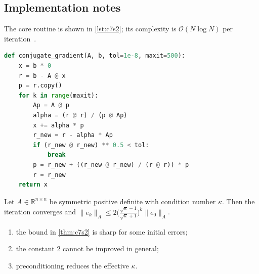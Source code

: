 \lipsum[48-49]

\subsection{Implementation notes}\label{sec:c7s2-i}
The core routine is shown in \cref{lst:c7s2}; its complexity is $\mathcal{O}(N\log N)$ per iteration~\cite{main-25}.

\begin{lstlisting}[language=python,caption={Reference implementation for c7s2.},label={lst:c7s2}]
def conjugate_gradient(A, b, tol=1e-8, maxit=500):
    x = b * 0
    r = b - A @ x
    p = r.copy()
    for k in range(maxit):
        Ap = A @ p
        alpha = (r @ r) / (p @ Ap)
        x += alpha * p
        r_new = r - alpha * Ap
        if (r_new @ r_new) ** 0.5 < tol:
            break
        p = r_new + ((r_new @ r_new) / (r @ r)) * p
        r = r_new
    return x
\end{lstlisting}

\kant[1-11]
\begin{theorem}\label{thm:c7s2}
Let $A\in\mathbb{R}^{n\times n}$ be symmetric positive definite with condition number $\kappa$. Then the iteration converges and
$\lVert e_k\rVert_A \le 2\bigl(\tfrac{\sqrt\kappa-1}{\sqrt\kappa+1}\bigr)^k\lVert e_0\rVert_A$.
\end{theorem}
\begin{enumerate}[label=(\roman*)]
\item the bound in \cref{thm:c7s2} is sharp for some initial errors;
\item the constant $2$ cannot be improved in general;
\item preconditioning reduces the effective $\kappa$.
\end{enumerate}

\kant[4-12]
